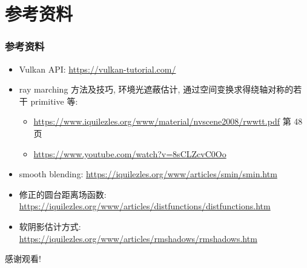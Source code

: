\documentclass[aspectratio=169]{ctexbeamer} %
\begin{document}
\section{参考资料}
\begin{frame}
    \frametitle{参考资料}
    \begin{itemize}
        \item Vulkan API: \url{https://vulkan-tutorial.com/}
        \item ray marching 方法及技巧, 环境光遮蔽估计, 通过空间变换求得绕轴对称的若干 primitive 等:
        \begin{itemize}
            \item \url{https://www.iquilezles.org/www/material/nvscene2008/rwwtt.pdf} 第 48 页
            \item \url{https://www.youtube.com/watch?v=8sCLZcvC0Oo}
        \end{itemize}
        \item smooth blending: \url{https://iquilezles.org/www/articles/smin/smin.htm}
        \item 修正的圆台距离场函数: \url{https://iquilezles.org/www/articles/distfunctions/distfunctions.htm}
        \item 软阴影估计方式: \url{https://iquilezles.org/www/articles/rmshadows/rmshadows.htm}
    \end{itemize}
\end{frame}

\begin{frame}
    \begin{center}
        \Huge{感谢观看!}
    \end{center}
\end{frame}
\end{document}

